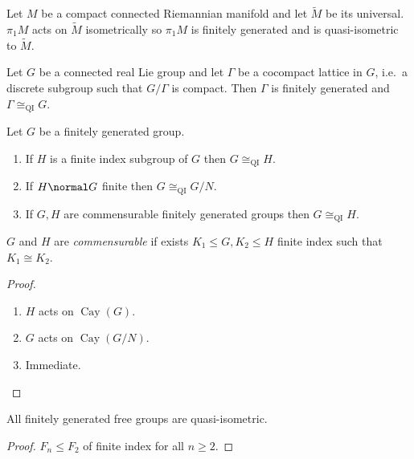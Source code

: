 \documentclass[a4paper]{article}
\DeclareMathOperator{\Cay}{Cay} %
\begin{document}
\begin{corollary}
  Let \(M\) be a compact connected Riemannian manifold and let \(\widetilde M\) be its universal. \(\pi_1M\) acts on \(\widetilde M\) isometrically so \(\pi_1M\) is finitely generated and is quasi-isometric to \(\widetilde M\).
\end{corollary}

\begin{corollary}
  Let \(G\) be a connected real Lie group and let \(\Gamma\) be a cocompact lattice in \(G\), i.e.\ a discrete subgroup such that \(G/\Gamma\) is compact. Then \(\Gamma\) is finitely generated and \(\Gamma \cong_{\mathrm{QI}} G\).
\end{corollary}

\begin{corollary}
  Let \(G\) be a finitely generated group.
  \begin{enumerate}
  \item If \(H\) is a finite index subgroup of \(G\) then \(G \cong_{\mathrm{QI}} H\).
  \item If \(H \normal G\) finite then \(G \cong_{\mathrm{QI}} G/N\).
  \item If \(G, H\) are commensurable finitely generated groups then \(G \cong_{\mathrm{QI}} H\).
  \end{enumerate}
\end{corollary}

\begin{definition}[commensurable]
  \(G\) and \(H\) are \emph{commensurable} if exists \(K_1 \leq G, K_2 \leq H\) finite index such that \(K_1 \cong K_2\).
\end{definition}

\begin{proof}\leavevmode
  \begin{enumerate}
  \item \(H\) acts on \(\Cay(G)\).
  \item \(G\) acts on \(\Cay(G/N)\).
  \item Immediate.
  \end{enumerate}
\end{proof}

\begin{corollary}
  All finitely generated free groups are quasi-isometric.
\end{corollary}

\begin{proof}
  \(F_n \leq F_2\) of finite index for all \(n \geq 2\).
\end{proof}
\end{document}
